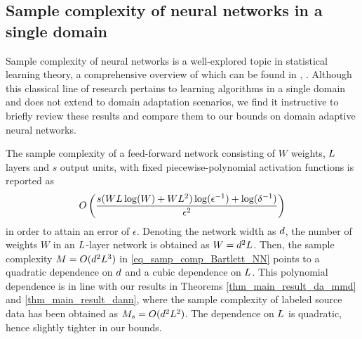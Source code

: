 \documentclass[review,supplement,onefignum,onetabnum]{siamonline250211}
\begin{document}
\subsection{Sample complexity of neural networks in a single domain}

Sample complexity of neural networks is a well-explored topic in statistical learning theory, a comprehensive overview of which can be found in \cite{AnthonyB02}, \cite{BartlettMR21}. Although this classical line of research pertains to learning algorithms in a single domain and does not extend to domain adaptation scenarios, we find it instructive to briefly review these results and compare them to our bounds on domain adaptive neural networks. 

The sample complexity of a feed-forward network consisting of $W$ weights, $L$ layers and $s$ output units, with fixed piecewise-polynomial activation functions is reported as \cite[Theorem 21.5]{AnthonyB02}
%
\begin{equation}
\label{eq_samp_comp_Bartlett_NN}
\begin{split}
O\left(  \frac{ s (W L \log(W) + W L^2) \log(\epsilon^{-1}) + \log(\delta^{-1})   }{\epsilon^2}   \right)
\end{split}
\end{equation}
%
in order to attain an error of $\epsilon$.  Denoting the network width as ${d}$, the number of weights $W$ in an $L$-layer network is  obtained as $W= {d}^2 L$. Then, the  sample complexity $M=O({d}^2 L^3)$ in \eqref{eq_samp_comp_Bartlett_NN} points to a quadratic dependence on ${d}$ and a cubic dependence on $L$.  This polynomial dependence is in line with our results in Theorems \ref{thm_main_result_da_mmd} and \ref{thm_main_result_dann}, where the sample complexity of labeled source data has been obtained as $M_s= O({d}^2 L^2)$. The dependence on $L$ is quadratic, hence slightly tighter in our bounds. 
\end{document}
